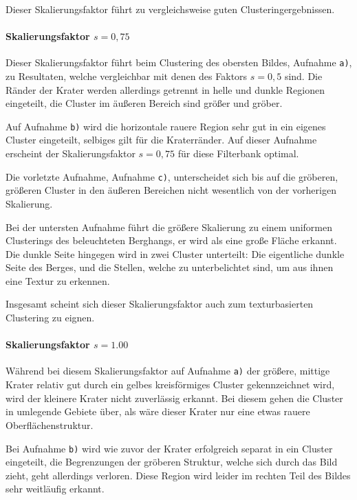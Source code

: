 Dieser Skalierungsfaktor führt zu vergleichsweise guten Clusteringergebnissen.

\paragraph{Skalierungsfaktor $s=0,75$}

Dieser Skalierungsfaktor führt beim Clustering des obersten Bildes, Aufnahme \texttt{a)}, zu Resultaten, welche vergleichbar mit denen des Faktors $s=0,5$ sind. Die Ränder der Krater werden allerdings getrennt in helle und dunkle Regionen eingeteilt, die Cluster im äußeren Bereich sind größer und gröber.

Auf Aufnahme \texttt{b)} wird die horizontale rauere Region sehr gut in ein eigenes Cluster eingeteilt, selbiges gilt für die Kraterränder. Auf dieser Aufnahme erscheint der Skalierungsfaktor $s=0,75$ für diese Filterbank optimal.

Die vorletzte Aufnahme, Aufnahme \texttt{c)}, unterscheidet sich bis auf die gröberen, größeren Cluster in den äußeren Bereichen nicht wesentlich von der vorherigen Skalierung.

Bei der untersten Aufnahme führt die größere Skalierung zu einem uniformen Clusterings des beleuchteten Berghangs, er wird als eine große Fläche erkannt. Die dunkle Seite hingegen wird in zwei Cluster unterteilt: Die eigentliche dunkle Seite des Berges, und die Stellen, welche zu unterbelichtet sind, um aus ihnen eine Textur zu erkennen.

Insgesamt scheint sich dieser Skalierungsfaktor auch zum texturbasierten Clustering zu eignen.

\paragraph{Skalierungsfaktor $s=1.00$}

Während bei diesem Skalierungsfaktor auf Aufnahme \texttt{a)} der größere, mittige Krater relativ gut durch ein gelbes kreisförmiges Cluster gekennzeichnet wird, wird der kleinere Krater nicht zuverlässig erkannt. Bei diesem gehen die Cluster in umlegende Gebiete über, als wäre dieser Krater nur eine etwas rauere Oberflächenstruktur.

Bei Aufnahme \texttt{b)} wird wie zuvor der Krater erfolgreich separat in ein Cluster eingeteilt, die Begrenzungen der gröberen Struktur, welche sich durch das Bild zieht, geht allerdings verloren. Diese Region wird leider im rechten Teil des Bildes sehr weitläufig erkannt.

